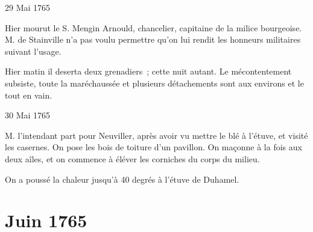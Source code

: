 \begin{diary}{29 Mai 1765}{}
        
                         Hier mourut le S. Mengin Arnould,
                           chancelier, capitaine de la milice
                              bourgeoise.
                           M. de Stainville n'a pas
                           voulu permettre
                           qu'on lui rendit les honneurs militaires suivant
                           l'usage. \bigskip
        
        
                         Hier matin il deserta deux
                           grenadiers ;
                           cette nuit autant. Le mécontentement subsiste,
                           toute la maréchaussée et plusieurs détachements
                           sont aux environs et le tout en vain. \bigskip
        
        
                     \end{diary}
                     \begin{diary}{30 Mai 1765}{}
                        
                        
                           M. l'intendant part pour
                              Neuviller, après
                           avoir vu mettre le blé à l'étuve, et visité
                           les casernes. On pose
                           les bois de toiture
                           d'un pavillon. On maçonne à la fois aux
                           deux aîles, et on commence à éléver les
                           corniches du corps du milieu. \bigskip
        
        
                         On a poussé la chaleur jusqu'à 40
                           degrés
                           à l'étuve de Duhamel.
                        \bigskip
        
        
                     \end{diary}
                  \chapter*{Juin 1765}
                     
                     
                     

